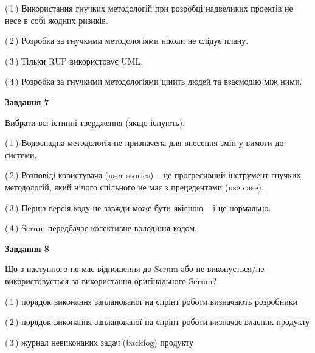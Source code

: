 \documentclass[10pt, ukrainian]{article}
\begin{document}
{\begin {large}
(\,1\,) Використання гнучких методологій при розробці надвеликих проектів не несе в собі жодних ризиків. %



(\,2\,) Розробка за гнучкими методологіями ніколи не слідує плану. %



(\,3\,) Тільки RUP використовує UML.%



(\,4\,) Розробка за гнучкими методологіями цінить людей та взаємодію між ними. %


{\begin {center}\textbf{Завдання 7}\end {center}}\par
Вибрати всі істинні твердження (якщо існують).\par
\vspace{2mm}



(\,1\,) Водоспадна методологія не призначена для внесення змін у вимоги до системи. %



(\,2\,) Розповіді користувача (user stories) – це прогресивний інструмент гнучких методологій, який нічого спільного не має з прецедентами (use case). %



(\,3\,) Перша версія коду не завжди може бути якісною -- і це нормально. %



(\,4\,) Scrum передбачає колективне володіння кодом. %


{\begin {center}\textbf{Завдання 8}\end {center}}\par
Що з наступного не має відношення до Scrum або не виконується/не використовується за використання оригінального Scrum?\par
\vspace{2mm}



(\,1\,) порядок виконання запланованої на спрінт роботи визначають розробники%



(\,2\,) порядок виконання запланованої на спрінт роботи визначає власник продукту%



(\,3\,) журнал невиконаних задач (backlog) продукту%




\end{large}}
\end{document}
